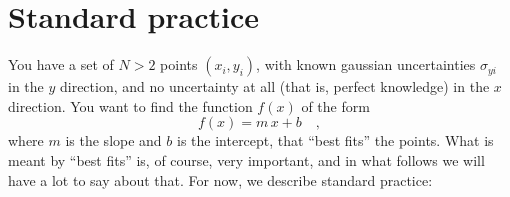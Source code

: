 \documentclass[12pt,twoside]{article}
\begin{document}
\section{Standard practice}\label{sec:standard}

You have a set of $N>2$ points $(x_i,y_i)$, with known gaussian
uncertainties $\sigma_{yi}$ in the $y$ direction, and no uncertainty
at all (that is, perfect knowledge) in the $x$ direction.  You want to
find the function $f(x)$ of the form
\begin{equation}\label{eq:fofx}
f(x) = m\,x + b \quad ,
\end{equation}
where $m$ is the slope and $b$ is the intercept, that ``best fits''
the points.  What is meant by ``best fits'' is, of course, very
important, and in what follows we will have a lot to say about that.
For now, we describe standard practice:
\end{document}

